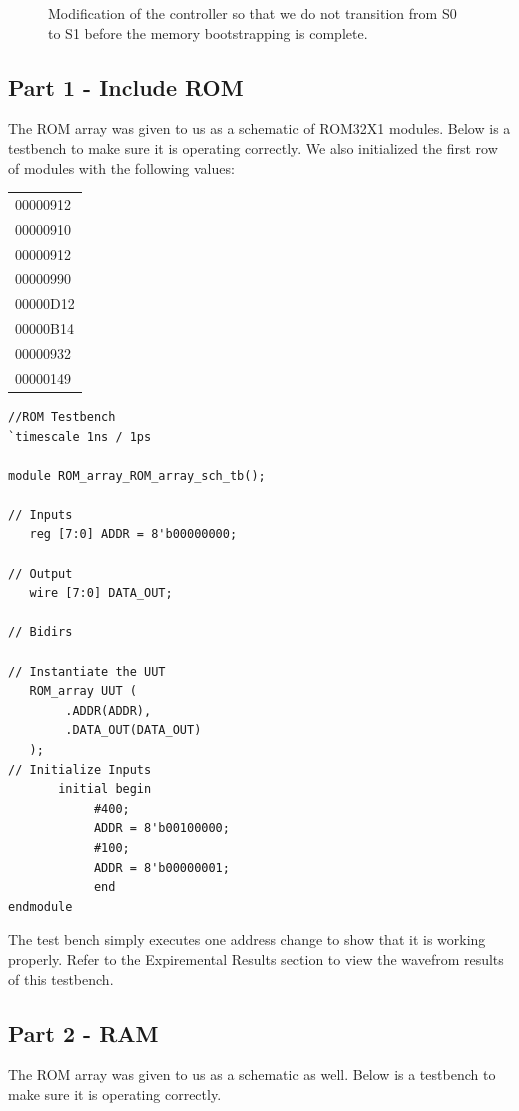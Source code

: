 \documentclass[12pt]{article}
\begin{document}
		\begin{figure}[h]
			\caption{Modification of the controller so that we do not transition from S0 to S1 before the memory bootstrapping is complete.}
		\end{figure}
		
		\newpage
	\subsection{Part 1 - Include ROM}
	The ROM array was given to us as a schematic of ROM32X1 modules. Below is a testbench to make sure it is operating correctly. We also initialized the first row of modules with the following values:

\begin{flushleft}
\begin{tabular}{|l|}
\hline
00000912 \\
00000910 \\
00000912 \\
00000990 \\
00000D12 \\
00000B14 \\
00000932 \\
00000149 \\
\hline
\end{tabular}
\end{flushleft}

		
		\begin{Verbatim}[frame=single, fontsize= \small]
//ROM Testbench
`timescale 1ns / 1ps

module ROM_array_ROM_array_sch_tb();

// Inputs
   reg [7:0] ADDR = 8'b00000000;

// Output
   wire [7:0] DATA_OUT;

// Bidirs

// Instantiate the UUT
   ROM_array UUT (
		.ADDR(ADDR), 
		.DATA_OUT(DATA_OUT)
   );
// Initialize Inputs
       initial begin
			#400;
			ADDR = 8'b00100000;
			#100;
			ADDR = 8'b00000001;
			end
endmodule
		\end{Verbatim}
		The test bench simply executes one address change to show that it is working properly. Refer to the Expiremental Results section to view the wavefrom results of this testbench.
		\newpage
		\subsection{Part 2 - RAM}
		The ROM array was given to us as a schematic as well. Below is a testbench to make sure it is operating correctly.
\end{document}
